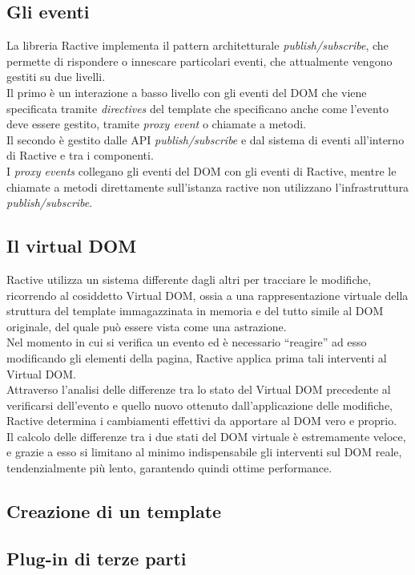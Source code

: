 \subsection{Gli eventi}
La libreria Ractive implementa il pattern architetturale  \textit{publish/subscribe}, che permette di rispondere o innescare particolari eventi, che attualmente vengono gestiti su due livelli.\\
Il primo è un interazione a basso livello con gli eventi del DOM che viene specificata tramite \textit{directives} del template che specificano anche  come l'evento deve essere gestito, tramite \textit{proxy event} o chiamate a metodi.\\
Il secondo è gestito dalle API \textit{publish/subscribe} e dal sistema di eventi all'interno di Ractive e tra i componenti.\\
I \textit{proxy events} collegano gli eventi del DOM con gli eventi di Ractive, mentre le chiamate a metodi direttamente sull'istanza ractive non utilizzano l'infrastruttura \textit{publish/subscribe}.
\subsection{Il virtual DOM}
Ractive utilizza un sistema differente dagli altri per tracciare le modifiche, ricorrendo al cosiddetto Virtual DOM, ossia a una rappresentazione virtuale della struttura del template immagazzinata in memoria e del tutto simile al DOM originale, del quale può essere vista come una astrazione.\\
Nel momento in cui si verifica un evento ed è necessario “reagire” ad esso modificando gli elementi della pagina, Ractive applica prima tali interventi al Virtual DOM.\\
Attraverso l’analisi delle differenze tra lo stato del Virtual DOM precedente al verificarsi dell’evento e quello nuovo ottenuto dall’applicazione delle modifiche, Ractive determina i cambiamenti effettivi da apportare al DOM vero e proprio.\\
Il calcolo delle differenze tra i due stati del DOM virtuale è estremamente veloce, e grazie a esso si limitano al minimo indispensabile gli interventi sul DOM reale, tendenzialmente più lento, garantendo quindi ottime performance.

\subsection{Creazione di un template}

\subsection{Plug-in di terze parti}\label{sec:packager}

